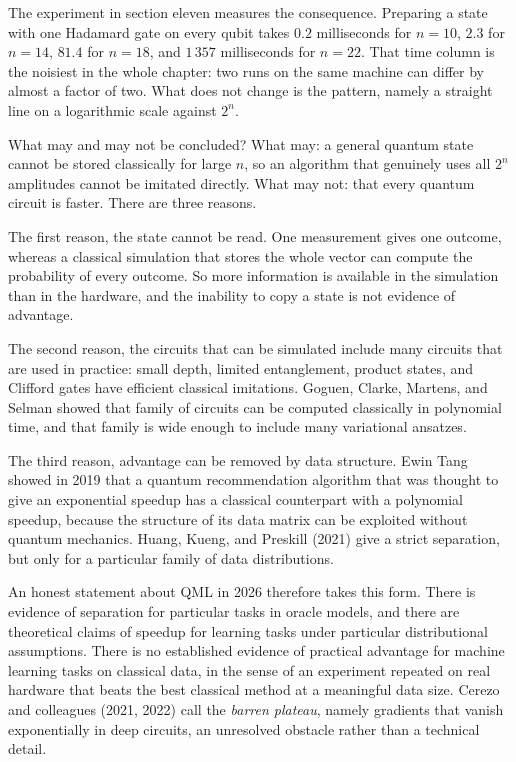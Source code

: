 The experiment in section eleven measures the consequence. Preparing a state with one
Hadamard gate on every qubit takes $0.2$ milliseconds for $n=10$, $2.3$ for $n=14$, $81.4$
for $n=18$, and $1\,357$ milliseconds for $n=22$. That time column is the noisiest in the
whole chapter: two runs on the same machine can differ by almost a factor of two. What
does not change is the pattern, namely a straight line on a logarithmic scale against
$2^{n}$.

What may and may not be concluded? What may: a general quantum state cannot be stored
classically for large $n$, so an algorithm that genuinely uses all $2^{n}$ amplitudes
cannot be imitated directly. What may not: that every quantum circuit is faster. There are
three reasons.

The first reason, the state cannot be read. One measurement gives one outcome, whereas a
classical simulation that stores the whole vector can compute the probability of every
outcome. So more information is available in the simulation than in the hardware, and the
inability to copy a state is not evidence of advantage.

The second reason, the circuits that can be simulated include many circuits that are used
in practice: small depth, limited entanglement, product states, and Clifford gates have
efficient classical imitations. Goguen, Clarke, Martens, and Selman showed that family of
circuits can be computed classically in polynomial time, and that family is wide enough to
include many variational ansatzes.

The third reason, advantage can be removed by data structure. Ewin Tang showed in 2019
that a quantum recommendation algorithm that was thought to give an exponential speedup
has a classical counterpart with a polynomial speedup, because the structure of its data
matrix can be exploited without quantum mechanics. Huang, Kueng, and Preskill (2021) give
a strict separation, but only for a particular family of data distributions.


An honest statement about QML in 2026 therefore takes this form. There is evidence of
separation for particular tasks in oracle models, and there are theoretical claims of
speedup for learning tasks under particular distributional assumptions. There is no
established evidence of practical advantage for machine learning tasks on classical data,
in the sense of an experiment repeated on real hardware that beats the best classical
method at a meaningful data size. Cerezo and colleagues (2021, 2022) call the
\emph{barren plateau}, namely gradients that vanish exponentially in deep circuits, an
unresolved obstacle rather than a technical detail.

